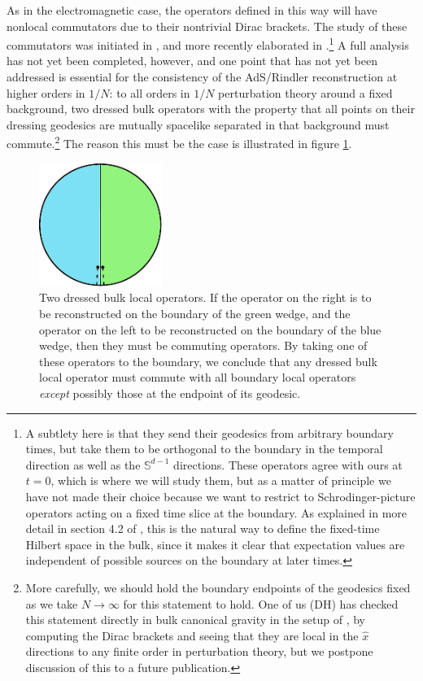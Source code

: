 \documentclass[11pt]{article}
\begin{document}
As in the electromagnetic case, the operators defined in this way will have nonlocal commutators due to their nontrivial Dirac brackets.  The study of these commutators was initiated in \cite{Heemskerk:2012mn}, and more recently elaborated in \cite{Kabat:2013wga}.\footnote{A subtlety here is that they send their geodesics from arbitrary boundary times, but take them to be orthogonal to the boundary in the temporal direction as well as the $\mathbb{S}^{d-1}$ directions. These operators agree with ours at $t=0$, which is where we will study them, but as a matter of principle we have not made their choice because we want to restrict to Schrodinger-picture operators acting on a fixed time slice at the boundary.  As explained in more detail in section 4.2 of \cite{Heemskerk:2012mn}, this is the natural way to define the fixed-time Hilbert space in the bulk, since it makes it clear that expectation values are independent of possible sources on the boundary at later times.}  A full analysis has not yet been completed, however, and one point that has not yet been addressed is essential for the consistency of the AdS/Rindler reconstruction at higher orders in $1/N$: to all orders in $1/N$ perturbation theory around a fixed background, two dressed bulk operators with the property that all points on their dressing geodesics are mutually spacelike separated in that background must commute.\footnote{More carefully, we should hold the boundary endpoints of the geodesics fixed as we take $N\to\infty$ for this statement to hold.  One of us (DH) has checked this statement directly in bulk canonical gravity in the setup of \cite{Kabat:2013wga}, by computing the Dirac brackets and seeing that they are local in the $\hat{x}$ directions to any finite order in perturbation theory, but we postpone discussion of this to a future publication.}  The reason this must be the case is illustrated in figure \ref{commutatorfig}.
\begin{figure}
\begin{center}
\includegraphics[height=4cm]{commutatorfig.pdf}
\caption{Two dressed bulk local operators.  If the operator on the right is to be reconstructed on the boundary of the green wedge, and the operator on the left to be reconstructed on the boundary of the blue wedge, then they must be commuting operators.  By taking one of these operators to the boundary, we conclude that any dressed bulk local operator must commute with all boundary local operators \textit{except} possibly those at the endpoint of its geodesic.}\label{commutatorfig}
\end{center}
\end{figure}
\end{document}

